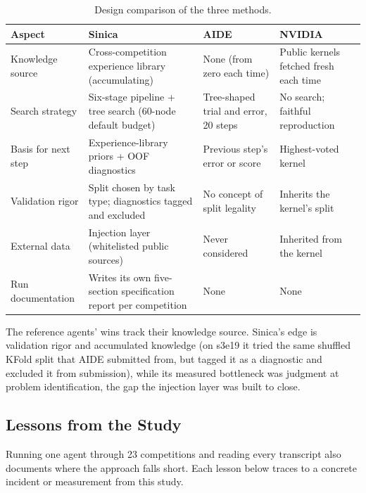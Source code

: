 \documentclass[11pt,a4paper]{article}
\begin{document}
\begin{table}[htbp]
\centering\footnotesize
\setlength{\tabcolsep}{4pt}
\caption{Design comparison of the three methods.}
\label{tab:threeway}
\begin{tabular}{@{}L{3.2cm}L{4.2cm}L{3.4cm}L{3.6cm}@{}}
\toprule
\textbf{Aspect} & \textbf{Sinica} & \textbf{AIDE} & \textbf{NVIDIA} \\
\midrule
Knowledge source & Cross-competition experience library (accumulating) & None (from zero each time) & Public kernels fetched fresh each time \\
Search strategy & Six-stage pipeline + tree search (60-node default budget) & Tree-shaped trial and error, 20 steps & No search; faithful reproduction \\
Basis for next step & Experience-library priors + OOF diagnostics & Previous step's error or score & Highest-voted kernel \\
Validation rigor & Split chosen by task type; diagnostics tagged and excluded & No concept of split legality & Inherits the kernel's split \\
External data & Injection layer (whitelisted public sources) & Never considered & Inherited from the kernel \\
Run documentation & Writes its own five-section specification report per competition & None & None \\
\bottomrule
\end{tabular}
\end{table}

The reference agents' wins track their knowledge source. Sinica's edge is validation rigor and accumulated knowledge (on s3e19 it tried the same shuffled KFold split that AIDE submitted from, but tagged it as a diagnostic and excluded it from submission), while its measured bottleneck was judgment at problem identification, the gap the injection layer was built to close.

\subsection{Lessons from the Study}
\label{sec:advice}

Running one agent through 23 competitions and reading every transcript also documents where the approach falls short. Each lesson below traces to a concrete incident or measurement from this study.
\end{document}

